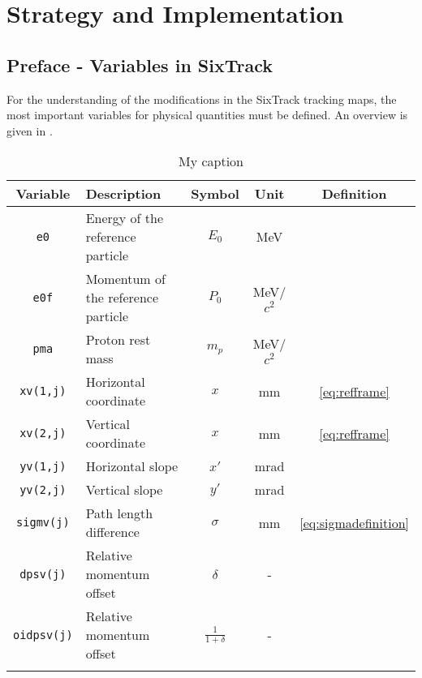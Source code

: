\section{Strategy and Implementation}
\subsection*{Preface - Variables in SixTrack}
For the understanding of the modifications in the SixTrack tracking maps, the most important variables for physical quantities must be defined. An overview is given in .

\begin{table}[h]
\centering
\caption{My caption}
\label{tab:sixtrack_variables}
\begin{tabular}{clccc}
\toprule
Variable             & Description           & Symbol & Unit & Definition\\ \midrule
\texttt{e0}          & Energy of the reference particle              & $E_0$                & MeV  &                      \\
\texttt{e0f}         & Momentum of the reference particle            & $P_0$                & MeV/$c^2$  &                      \\
\texttt{pma}         & Proton rest mass            & $m_p$                & MeV/$c^2$  &                      \\
\texttt{xv(1,j)}     & Horizontal coordinate                         & $x$                  & mm   & \eqref{eq:refframe}  \\
\texttt{xv(2,j)}     & Vertical coordinate                           & $x$                  & mm   & \eqref{eq:refframe}  \\
\texttt{yv(1,j)}     & Horizontal slope                              & $x'$                 & mrad \\
\texttt{yv(2,j)}     & Vertical slope                                & $y'$                 & mrad \\
\texttt{sigmv(j)}    & Path length difference                        & $\sigma$             & mm   & \eqref{eq:sigmadefinition}  \\
\texttt{dpsv(j)}     & Relative momentum offset                      & $\delta$             & -    &      \\
\texttt{oidpsv(j)}   & Relative momentum offset                      & $\frac{1}{1+\delta}$ & -    &     \\
                &                       &      \\ \midrule

\end{tabular}
\end{table}
